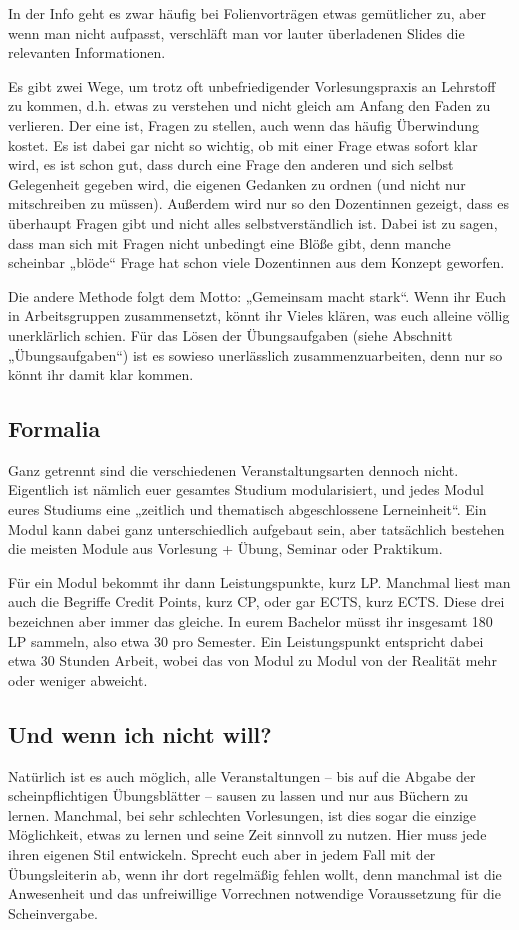 In der Info geht es zwar häufig bei Folienvorträgen etwas gemütlicher zu, aber wenn man nicht aufpasst, verschläft man vor lauter überladenen Slides die relevanten Informationen.

Es gibt zwei Wege, um trotz oft unbefriedigender Vorlesungspraxis an Lehrstoff zu kommen, d.h. etwas zu verstehen und nicht gleich am Anfang den Faden zu verlieren. Der eine ist, Fragen zu stellen, auch wenn das häufig Überwindung kostet. Es ist dabei gar nicht so wichtig, ob mit einer Frage etwas sofort klar wird, es ist schon gut, dass durch eine Frage den anderen und sich selbst Gelegenheit gegeben wird, die eigenen Gedanken zu ordnen (und nicht nur mitschreiben zu müssen). Außerdem wird nur so den Dozentinnen gezeigt, dass es überhaupt Fragen gibt und nicht alles selbstverständlich ist. Dabei ist zu sagen, dass man sich mit Fragen nicht unbedingt eine Blöße gibt, denn manche scheinbar „blöde“ Frage hat schon viele Dozentinnen aus dem Konzept geworfen.

Die andere Methode folgt dem Motto: „Gemeinsam macht stark“. Wenn ihr Euch in Arbeitsgruppen zusammensetzt, könnt ihr Vieles klären, was euch alleine völlig unerklärlich schien. Für das Lösen der Übungsaufgaben (siehe Abschnitt „Übungsaufgaben“) ist es sowieso unerlässlich zusammenzuarbeiten, denn nur so könnt ihr damit klar kommen.
\vspace{-2mm}

\subsection{Formalia}

Ganz getrennt sind die verschiedenen Veranstaltungsarten dennoch nicht. Eigentlich ist nämlich euer gesamtes Studium modularisiert, und jedes Modul eures Studiums eine „zeitlich und thematisch abgeschlossene Lerneinheit“. Ein Modul kann dabei ganz unterschiedlich aufgebaut sein, aber tatsächlich bestehen die meisten Module aus Vorlesung + Übung, Seminar oder Praktikum.

Für ein Modul bekommt ihr dann Leistungspunkte, kurz \gls{LP}. Manchmal liest man auch die Begriffe Credit Points, kurz \gls{CP}, oder gar \gls{ECTS}, kurz ECTS. Diese drei bezeichnen aber immer das gleiche. In eurem Bachelor müsst ihr insgesamt 180 \gls{LP} sammeln, also etwa 30 pro Semester. Ein Leistungspunkt entspricht dabei etwa 30 Stunden Arbeit, wobei das von Modul zu Modul von der Realität mehr oder weniger abweicht.

\subsection{Und wenn ich nicht will?}

Natürlich ist es auch möglich, alle Veranstaltungen -- bis auf die Abgabe der scheinpflichtigen Übungsblätter -- sausen zu lassen und nur aus Büchern zu lernen. Manchmal, bei sehr schlechten Vorlesungen, ist dies sogar die einzige Möglichkeit, etwas zu lernen und seine Zeit sinnvoll zu nutzen. Hier muss jede ihren eigenen Stil entwickeln. Sprecht euch aber in jedem Fall mit der Übungsleiterin ab, wenn ihr dort regelmäßig fehlen wollt, denn manchmal ist die Anwesenheit und das unfreiwillige Vorrechnen notwendige Voraussetzung für die Scheinvergabe.
